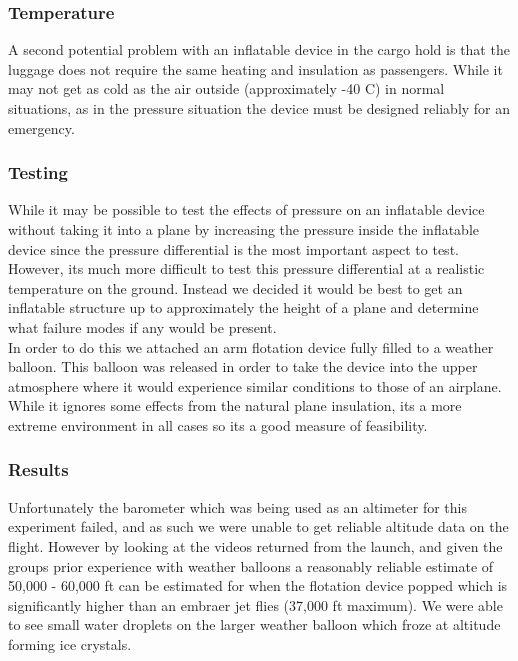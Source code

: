 \subsubsection{Temperature}
A second potential problem with an inflatable device in the cargo hold is that the luggage does not require the same heating and insulation as passengers. While it may not get as cold as the air outside (approximately -40 C) in normal situations, as in the pressure situation the device must be designed reliably for an emergency. \\

\subsubsection{Testing}
While it may be possible to test the effects of pressure on an inflatable device without taking it into a plane by increasing the pressure inside the inflatable device since the pressure differential is the most important aspect to test. However, its much more difficult to test this pressure differential at a realistic temperature on the ground. Instead we decided it would be best to get an inflatable structure up to approximately the height of a plane and determine what failure modes if any would be present. \\

In order to do this we attached an arm flotation device fully filled to a weather balloon. This balloon was released in order to take the device into the upper atmosphere where it would experience similar conditions to those of an airplane. While it ignores some effects from the natural plane insulation, its a more extreme environment in all cases so its a good measure of feasibility. \\

\subsubsection{Results}
Unfortunately the barometer which was being used as an altimeter for this experiment failed, and as such we were unable to get reliable altitude data on the flight. However by looking at the videos returned from the launch, and given the groups prior experience with weather balloons a reasonably reliable estimate of 50,000 - 60,000 ft can be estimated for when the flotation device popped which is significantly higher than an embraer jet flies (37,000 ft maximum). We were able to see small water droplets on the larger weather balloon which froze at altitude forming ice crystals.


